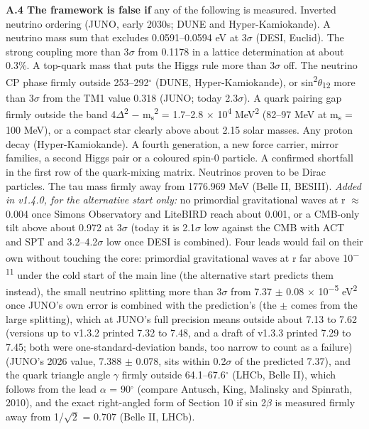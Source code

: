 \documentclass[
  11pt,
]{article}
\begin{document}
\textbf{A.4 The framework is false if} any of the following is measured. Inverted neutrino ordering (JUNO, early 2030s; DUNE and Hyper-Kamiokande). A neutrino mass sum that excludes 0.0591--0.0594 eV at 3\ensuremath{\sigma} (DESI, Euclid). The strong coupling more than 3\ensuremath{\sigma} from 0.1178 in a lattice determination at about 0.3\%. A top-quark mass that puts the Higgs rule more than 3\ensuremath{\sigma} off. The neutrino CP phase firmly outside 253--292\ensuremath{^\circ} (DUNE, Hyper-Kamiokande), or sin\textsuperscript{2}\ensuremath{\theta}\textsubscript{12} more than 3\ensuremath{\sigma} from the TM1 value 0.318 (JUNO; today 2.3\ensuremath{\sigma}). A quark pairing gap firmly outside the band 4\ensuremath{\Delta}\textsuperscript{2} \ensuremath{-} m\textsubscript{s}\textsuperscript{2} = 1.7--2.8 \ensuremath{\times} 10\textsuperscript{4} MeV\textsuperscript{2} (82--97 MeV at m\textsubscript{s} = 100 MeV), or a compact star clearly above about 2.15 solar masses. Any proton decay (Hyper-Kamiokande). A fourth generation, a new force carrier, mirror families, a second Higgs pair or a coloured spin-0 particle. A confirmed shortfall in the first row of the quark-mixing matrix. Neutrinos proven to be Dirac particles. The tau mass firmly away from 1776.969 MeV (Belle II, BESIII). \emph{Added in v1.4.0, for the alternative start only:} no primordial gravitational waves at r \ensuremath{\approx} 0.004 once Simons Observatory and LiteBIRD reach about 0.001, or a CMB-only tilt above about 0.972 at 3\ensuremath{\sigma} (today it is 2.1\ensuremath{\sigma} low against the CMB with ACT and SPT and 3.2--4.2\ensuremath{\sigma} low once DESI is combined). Four leads would fail on their own without touching the core: primordial gravitational waves at r far above 10\textsuperscript{\ensuremath{-}11} under the cold start of the main line (the alternative start predicts them instead), the small neutrino splitting more than 3\ensuremath{\sigma} from 7.37 \ensuremath{\pm} 0.08 \ensuremath{\times} 10\textsuperscript{\ensuremath{-}5} eV\textsuperscript{2} once JUNO's own error is combined with the prediction's (the \ensuremath{\pm} comes from the large splitting), which at JUNO's full precision means outside about 7.13 to 7.62 (versions up to v1.3.2 printed 7.32 to 7.48, and a draft of v1.3.3 printed 7.29 to 7.45; both were one-standard-deviation bands, too narrow to count as a failure) (JUNO's 2026 value, 7.388 \ensuremath{\pm} 0.078, sits within 0.2\ensuremath{\sigma} of the predicted 7.37), and the quark triangle angle \ensuremath{\gamma} firmly outside 64.1--67.6\ensuremath{^\circ} (LHCb, Belle II), which follows from the lead \ensuremath{\alpha} = 90\ensuremath{^\circ} (compare Antusch, King, Malinsky and Spinrath, 2010), and the exact right-angled form of Section 10 if sin 2\ensuremath{\beta} is measured firmly away from 1/\ensuremath{\sqrt{2}} = 0.707 (Belle II, LHCb).
\end{document}
